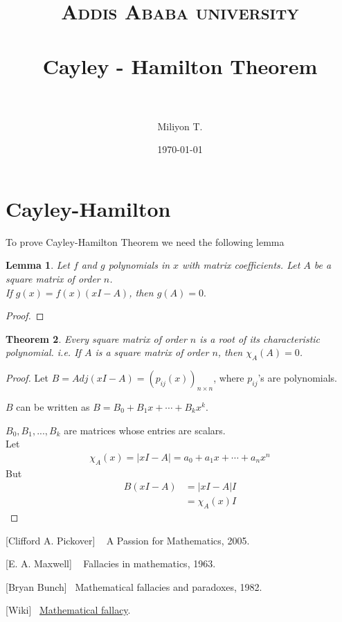 \documentclass[paper=a4, fontsize=12pt]{scrartcl} %
\title{	
\normalfont \normalsize
\textsc{Addis Ababa university} \\ [25pt] %
\horrule{0.5pt} \\[0.4cm] %
\huge Cayley - Hamilton Theorem \\ %
\horrule{2pt} \\[0.5cm] %
}
\author{Miliyon T.} %
\date{\normalsize\today} %
\newtheorem{thm}{Theorem}[section]
\newtheorem{lem}[thm]{Lemma}
\theoremstyle{definition}
\theoremstyle{remark}
\begin{document}
\maketitle 
\section{Cayley-Hamilton}
To prove Cayley-Hamilton Theorem we need the following lemma
\begin{lem}
Let $f$ and $g$ polynomials in $x$ with matrix coefficients. Let $A$ be a square matrix of order $n$.\\
If $g(x)=f(x)(xI-A)$, then $g(A)=0.$
\end{lem}

\begin{proof}

\end{proof}

\begin{thm}
Every square matrix of order $n$ is a root of its characteristic polynomial. i.e. If $A$ is a square matrix of order $n$, then $\chi_A(A)=0$.
\end{thm}

\begin{proof}
Let $B=Adj(xI-A)=(p_{ij}(x))_{n\times n}$, where $p_{ij}$'s are polynomials.

$B$ can be written as $B=B_0+B_1x+\cdots+B_kx^k$.

$B_0,B_1,...,B_k$ are matrices whose entries are scalars.\\
Let
\begin{align}
\chi_A(x)=|xI-A|=a_0+a_1x+\cdots+a_nx^n
\end{align}
But
\begin{align*}
B(xI-A)&=|xI-A|I\\
       &=\chi_A(x)I
\end{align*}
\end{proof}
\newpage
\begin{thebibliography}{9}

[Clifford A. Pickover] ~
A Passion for Mathematics, 2005.

[E. A. Maxwell] ~
Fallacies in mathematics, 1963.

[Bryan Bunch]~
Mathematical fallacies and paradoxes, 1982.

[Wiki]~
\href{http://www.wikipedia.org}{Mathematical fallacy}.

\end{thebibliography}
\end{document}

